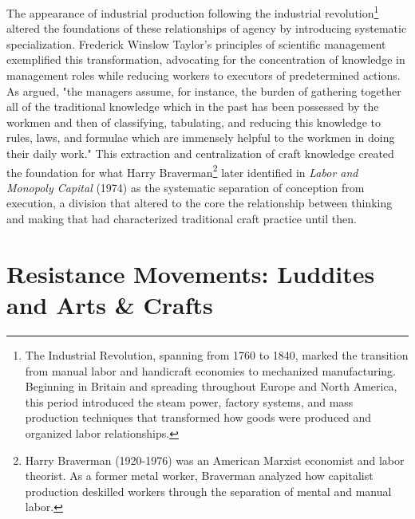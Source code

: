 The appearance of industrial production following the industrial revolution\footnote{The Industrial Revolution, spanning from 1760 to 1840, marked the transition from manual labor and handicraft economies to mechanized manufacturing. Beginning in Britain and spreading throughout Europe and North America, this period introduced the steam power, factory systems, and mass production techniques that transformed how goods were produced and organized labor relationships.} altered the foundations of these relationships of agency by introducing systematic specialization. Frederick Winslow Taylor's principles of scientific management exemplified this transformation, advocating for the concentration of knowledge in management roles while reducing workers to executors of predetermined actions. As \citet{taylor1911} argued, "the managers assume, for instance, the burden of gathering together all of the traditional knowledge which in the past has been possessed by the workmen and then of classifying, tabulating, and reducing this knowledge to rules, laws, and formulae which are immensely helpful to the workmen in doing their daily work." This extraction and centralization of craft knowledge created the foundation for what Harry Braverman\footnote{Harry Braverman (1920-1976) was an American Marxist economist and labor theorist. As a former metal worker, Braverman analyzed how capitalist production deskilled workers through the separation of mental and manual labor.} later identified in \textit{Labor and Monopoly Capital} (1974) as the systematic separation of conception from execution, a division that altered to the core the relationship between thinking and making that had characterized traditional craft practice until then.

\section{Resistance Movements: Luddites and Arts \& Crafts}

